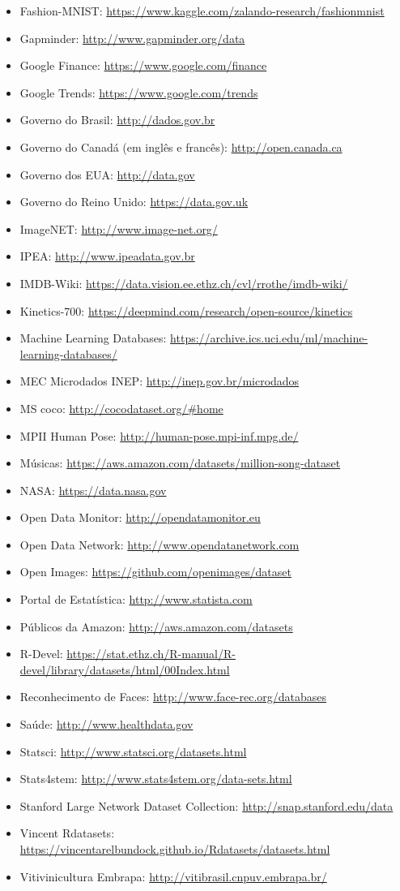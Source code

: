\documentclass[a4paper,11pt]{book} %
\begin{document}
\begin{itemize}[noitemsep]
	\item Fashion-MNIST: \url{https://www.kaggle.com/zalando-research/fashionmnist}
	\item Gapminder: \url{http://www.gapminder.org/data}
	\item Google Finance: \url{https://www.google.com/finance}
	\item Google Trends: \url{https://www.google.com/trends}
	\item Governo do Brasil: \url{http://dados.gov.br}
	\item Governo do Canadá (em inglês e francês): \url{http://open.canada.ca}
	\item Governo dos EUA: \url{http://data.gov}
	\item Governo do Reino Unido: \url{https://data.gov.uk}
	\item ImageNET: \url{http://www.image-net.org/}
	\item IPEA: \url{http://www.ipeadata.gov.br}
	\item IMDB-Wiki: \url{https://data.vision.ee.ethz.ch/cvl/rrothe/imdb-wiki/}
	\item Kinetics-700: \url{https://deepmind.com/research/open-source/kinetics}
	\item Machine Learning Databases: \url{https://archive.ics.uci.edu/ml/machine-learning-databases/}
	\item MEC Microdados INEP: \url{http://inep.gov.br/microdados}
	\item MS coco: \url{http://cocodataset.org/#home}
	\item MPII Human Pose: \url{http://human-pose.mpi-inf.mpg.de/}
	\item Músicas: \url{https://aws.amazon.com/datasets/million-song-dataset}
	\item NASA: \url{https://data.nasa.gov}
	\item Open Data Monitor: \url{http://opendatamonitor.eu}
	\item Open Data Network: \url{http://www.opendatanetwork.com}
	\item Open Images: \url{https://github.com/openimages/dataset}
	\item Portal de Estatística: \url{http://www.statista.com}
	\item Públicos da Amazon: \url{http://aws.amazon.com/datasets}
	\item R-Devel: \url{https://stat.ethz.ch/R-manual/R-devel/library/datasets/html/00Index.html}
	\item Reconhecimento de Faces: \url{http://www.face-rec.org/databases}
	\item Saúde: \url{http://www.healthdata.gov}
	\item Statsci: \url{http://www.statsci.org/datasets.html}
	\item Stats4stem: \url{http://www.stats4stem.org/data-sets.html}
	\item Stanford Large Network Dataset Collection: \url{http://snap.stanford.edu/data}
	\item Vincent Rdatasets: \url{https://vincentarelbundock.github.io/Rdatasets/datasets.html}
	\item Vitivinicultura Embrapa: \url{http://vitibrasil.cnpuv.embrapa.br/}
\end{itemize}
\end{document}
